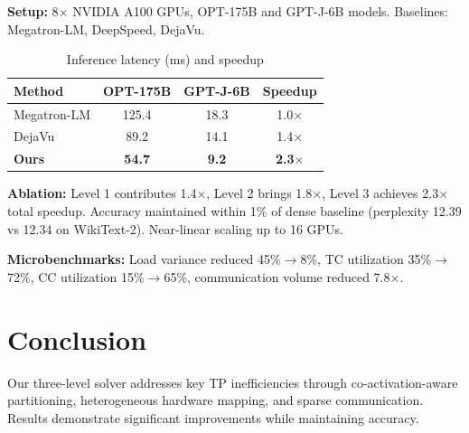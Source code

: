 \documentclass[runningheads]{llncs}
\begin{document}
\textbf{Setup:} 8$\times$ NVIDIA A100 GPUs, OPT-175B and GPT-J-6B models. Baselines: Megatron-LM, DeepSpeed, DejaVu.

\begin{table}[h]
\caption{Inference latency (ms) and speedup}
\label{tab:results}
\centering
\begin{tabular}{lccc}
\toprule
\textbf{Method} & \textbf{OPT-175B} & \textbf{GPT-J-6B} & \textbf{Speedup} \\
\midrule
Megatron-LM & 125.4 & 18.3 & 1.0$\times$ \\
DejaVu & 89.2 & 14.1 & 1.4$\times$ \\
\textbf{Ours} & \textbf{54.7} & \textbf{9.2} & \textbf{2.3$\times$} \\
\bottomrule
\end{tabular}
\end{table}

\textbf{Ablation:} Level 1 contributes 1.4$\times$, Level 2 brings 1.8$\times$, Level 3 achieves 2.3$\times$ total speedup. Accuracy maintained within 1\% of dense baseline (perplexity 12.39 vs 12.34 on WikiText-2). Near-linear scaling up to 16 GPUs.

\textbf{Microbenchmarks:} Load variance reduced 45\%$\rightarrow$8\%, TC utilization 35\%$\rightarrow$72\%, CC utilization 15\%$\rightarrow$65\%, communication volume reduced 7.8$\times$.

\section{Conclusion}

Our three-level solver addresses key TP inefficiencies through co-activation-aware partitioning, heterogeneous hardware mapping, and sparse communication. Results demonstrate significant improvements while maintaining accuracy.



\end{document}
